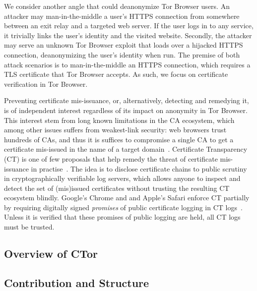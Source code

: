 %
%
We consider another angle that could deanonymize Tor Browser users.
An attacker may man-in-the-middle a user's HTTPS connection from somewhere
between an exit relay and a targeted web server.  If the user logs in to any
service, it trivially links the user's identity and the visited website.
Secondly, the attacker may serve an unknown Tor Browser exploit that loads over
a hijacked HTTPS connection, deanonymizing the user's identity when run.
The premise of both attack scenarios is to man-in-the-middle an HTTPS
connection, which requires a TLS certificate that Tor Browser accepts.  As
such, we focus on certificate verification in Tor Browser.

%
Preventing certificate mis-issuance, or, alternatively, detecting and remedying
it, is of independent interest regardless of its impact on anonymity in Tor
Browser.  This interest stem from long known limitations in the CA ecosystem,
which among other issues suffers from weakest-link security:
	web browsers trust hundreds of CAs, and thus it is suffices to compromise
	a single CA to get a certificate mis-issued in the name of a target
	domain~\cite{ca-ecosystem,https-sok}.
Certificate Transparency (CT) is one of few proposals that help remedy the
threat of certificate mis-issuance in practise~\cite{ct/a,ct,ct/bis}.  The idea
is to disclose certificate chains to public scrutiny in cryptographically
verifiable log servers, which allows anyone to inspect and detect the set of
(mis)issued certificates without trusting the resulting CT ecosystem blindly.
Google's Chrome and and Apple's Safari enforce CT partially by requiring
digitally signed \emph{promises} of public certificate logging in CT
logs~\cite{chrome-policy,safari-policy}.  Unless it is verified that these
promises of public logging are held, all CT logs must be trusted.

\subsection{Overview of CTor}

\subsection{Contribution and Structure}
